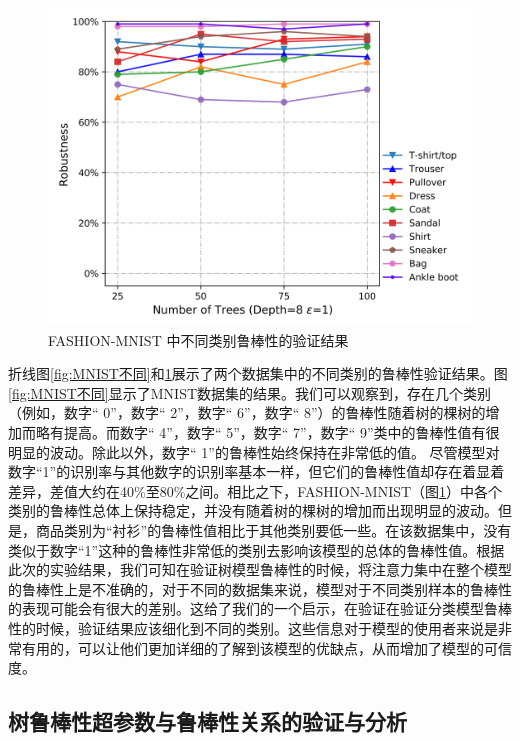 \begin{figure}[!hbt]
\centering
\includegraphics[scale=0.7]{fig2/C5/fashion_com.png}
	\caption{FASHION-MNIST 中不同类别鲁棒性的验证结果}
	\label{fig:Fashion不同}	
\end{figure}



折线图\ref{fig:MNIST不同}和\ref{fig:Fashion不同}展示了两个数据集中的不同类别的鲁棒性验证结果。图\ref{fig:MNIST不同}显示了MNIST数据集的结果。我们可以观察到，存在几个类别（例如，数字“ 0”，数字“ 2”，数字“ 6”，数字“ 8”）的鲁棒性随着树的棵树的增加而略有提高。而数字“ 4”，数字“ 5”，数字“ 7”，数字“ 9”类中的鲁棒性值有很明显的波动。除此以外，数字“ 1”的鲁棒性始终保持在非常低的值。 尽管模型对数字“1”的识别率与其他数字的识别率基本一样，但它们的鲁棒性值却存在着显着差异，差值大约在40$\%$至80$\%$之间。相比之下，FASHION-MNIST（图\ref{fig:Fashion不同}）中各个类别的鲁棒性总体上保持稳定，并没有随着树的棵树的增加而出现明显的波动。但是，商品类别为“衬衫”的鲁棒性值相比于其他类别要低一些。在该数据集中，没有类似于数字“1”这种的鲁棒性非常低的类别去影响该模型的总体的鲁棒性值。根据此次的实验结果，我们可知在验证树模型鲁棒性的时候，将注意力集中在整个模型的鲁棒性上是不准确的，对于不同的数据集来说，模型对于不同类别样本的鲁棒性的表现可能会有很大的差别。这给了我们的一个启示，在验证在验证分类模型鲁棒性的时候，验证结果应该细化到不同的类别。这些信息对于模型的使用者来说是非常有用的，可以让他们更加详细的了解到该模型的优缺点，从而增加了模型的可信度。

\subsection{树鲁棒性超参数与鲁棒性关系的验证与分析}

